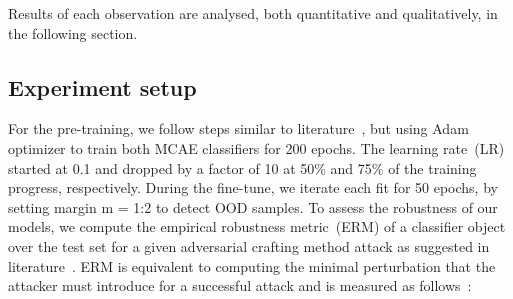 \hspace*{3.5mm} Results of each observation are analysed, both quantitative and qualitatively, in the following section. 

\subsection{Experiment setup}
For the pre-training, we follow steps similar to literature~\cite{OOD19}, but using Adam optimizer to train both MCAE classifiers for 200 epochs. The learning rate~(LR) started at 0.1 and dropped by a factor of 10 at 50\% and 75\% of the training progress, respectively. During the fine-tune, we iterate each fit for 50 epochs, by setting margin m = 1:2 to detect OOD samples. 
To assess the robustness of our models, we compute the empirical robustness metric~(ERM) of a classifier object over the test set for a given adversarial crafting method attack as suggested in literature~\cite{moosavi2016deepfool}. ERM is equivalent to computing the minimal perturbation that the attacker must introduce for a successful attack and is measured as follows~\cite{moosavi2016deepfool}:

